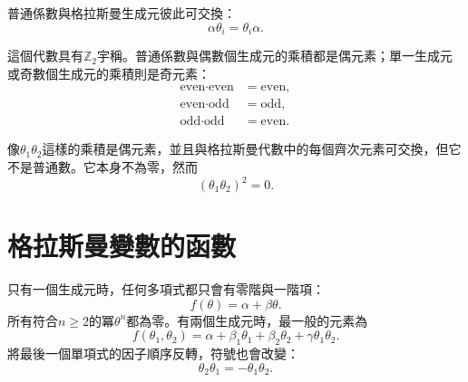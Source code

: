 普通係數與格拉斯曼生成元彼此可交換：
\begin{equation}
\alpha\theta_i=\theta_i\alpha.
\end{equation}

\begin{classroomqa}
\end{classroomqa}

這個代數具有\(\mathbb Z_2\)宇稱。普通係數與偶數個生成元的乘積都是偶元素；單一生成元或奇數個生成元的乘積則是奇元素：
\begin{equation}
\begin{aligned}
\text{even}\cdot\text{even}&=\text{even},\\
\text{even}\cdot\text{odd}&=\text{odd},\\
\text{odd}\cdot\text{odd}&=\text{even}.
\end{aligned}
\end{equation}

\begin{classroomqa}
\end{classroomqa}

像\(\theta_1\theta_2\)這樣的乘積是偶元素，並且與格拉斯曼代數中的每個齊次元素可交換，但它不是普通數。它本身不為零，然而
\begin{equation}
(\theta_1\theta_2)^2=0.
\end{equation}

\begin{classroomqa}
\end{classroomqa}

\section{格拉斯曼變數的函數}

只有一個生成元時，任何多項式都只會有零階與一階項：
\begin{equation}
f(\theta)=\alpha+\beta\theta.
\end{equation}
所有符合\(n\geq2\)的冪\(\theta^n\)都為零。有兩個生成元時，最一般的元素為
\begin{equation}
f(\theta_1,\theta_2)
=\alpha+\beta_1\theta_1+\beta_2\theta_2
+\gamma\theta_1\theta_2.
\end{equation}
將最後一個單項式的因子順序反轉，符號也會改變：
\begin{equation}
\theta_2\theta_1=-\theta_1\theta_2.
\end{equation}

